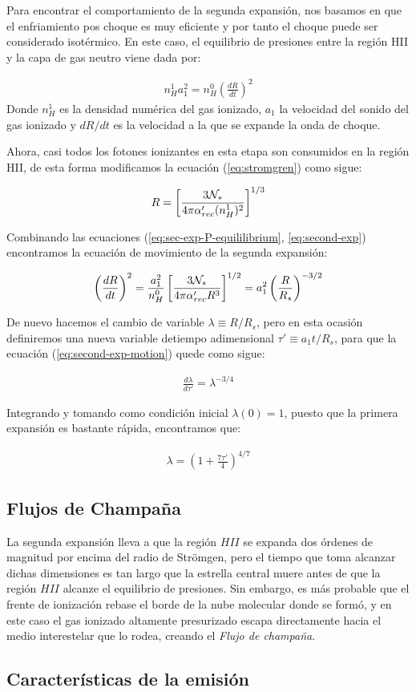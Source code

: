 Para encontrar el comportamiento de la segunda expansión, nos basamos en que el enfriamiento pos choque es muy eficiente y por tanto el choque puede ser considerado isotérmico. En este caso, el equilibrio de presiones entre la región HII y la capa de gas neutro viene dada por:

\begin{align}
  n^1_H a^2_1 = n^0_H\left(\frac{dR}{dt}\right)^2 \label{eq:sec-exp-P-equililibrium}
\end{align}
Donde $n^1_H$ es la densidad numérica del gas ionizado, $a_1$ la velocidad del sonido del gas ionizado y $dR/dt$ es la velocidad a la que se expande la onda de choque.

Ahora, casi todos los fotones ionizantes en esta etapa son consumidos en la región HII, de esta forma modificamos la ecuación (\ref{eq:stromgren}) como sigue:

\begin{align}
    R = \left[\frac{3\mathcal{N}_*}{4\pi\alpha'_{rec}(n^1_H)^2}\right]^{1/3} \label{eq:second-exp}
\end{align}

Combinando las ecuaciones (\ref{eq:sec-exp-P-equililibrium}, \ref{eq:second-exp}) encontramos la ecuación de movimiento de la segunda expansión:

\begin{align}
  \left(\frac{dR}{dt}\right)^2 = \frac{a^2_1}{n^0_H}\left[\frac{3\mathcal{N}_*}{4\pi\alpha'_{rec}R^3}\right]^{1/2} = a^2_1\left(\frac{R}{R_s}\right)^{-3/2} \label{eq:second-exp-motion}
\end{align}

De nuevo hacemos el cambio de variable $\lambda \equiv R/R_s$, pero en esta ocasión definiremos una nueva variable detiempo adimensional $\tau' \equiv a_1 t/R_s$, para que la ecuación (\ref{eq:second-exp-motion}) quede como sigue:

\begin{align}
  \frac{d\lambda}{d\tau'} = \lambda^{-3/4}
\end{align}

Integrando y tomando como condición inicial $\lambda(0) = 1$, puesto que la primera expansión es bastante rápida, encontramos que:

\begin{align}
  \lambda = \left(1 + \frac{7\tau'}{4}\right)^{4/7}
\end{align}


\subsection{Flujos de Champaña}
La segunda expansión lleva a que la región $HII$ se expanda dos órdenes de magnitud por encima del radio de Strömgen, pero el tiempo que toma alcanzar dichas dimensiones es tan largo que la estrella central muere antes de que la región $HII$ alcanze el equilibrio de presiones. Sin embargo, es más probable que el frente de ionización rebase el borde de la nube molecular donde se formó, y en este caso el gas ionizado altamente presurizado escapa directamente hacia el medio interestelar que lo rodea, creando el \textit{Flujo de champaña}.

\subsection{Características de la emisión}

